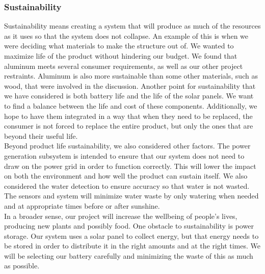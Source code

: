 \subsubsection{Sustainability}
Sustainability means creating a system that will produce as much of the resources as it uses so that the system does not collapse. An example of this is when we were deciding what materials to make the structure out of. We wanted to maximize life of the product without hindering our budget. We found that aluminum meets several consumer requirements, as well as our other project restraints. Aluminum is also more sustainable than some other materials, such as wood, that were involved in the discussion. Another point for sustainability that we have considered is both battery life and the life of the solar panels. We want to find a balance between the life and cost of these components. Additionally, we hope to have them integrated in a way that when they need to be replaced, the consumer is not forced to replace the entire product, but only the ones that are beyond their useful life. \\

Beyond product life sustainability, we also considered other factors. The power generation subsystem is intended to ensure that our system does not need to draw on the power grid in order to function correctly. This will lower the impact on both the environment and how well the product can sustain itself. We also considered the water detection to ensure accuracy so that water is not wasted. The sensors and system will minimize water waste by only watering when needed and at appropriate times before or after sunshine. \\

In a broader sense, our project will increase the wellbeing of people’s lives, producing new plants and possibly food. One obstacle to sustainability is power storage. Our system uses a solar panel to collect energy, but that energy needs to be stored in order to distribute it in the right amounts and at the right times. We will be selecting our battery carefully and minimizing the waste of this as much as possible.

